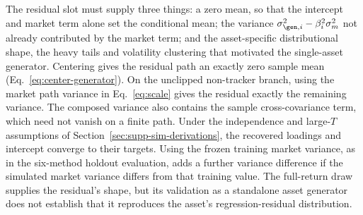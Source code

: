 The residual slot must supply three things: a zero mean, so that the
intercept and market term alone set the conditional mean; the variance
$\sigma_{\gen,i}^2 - \beta_i^2 \sigma_m^2$ not already contributed by
the market term; and the asset-specific distributional shape, the
heavy tails and volatility clustering that motivated the single-asset
generator. Centering gives the residual path an exactly zero sample
mean (Eq.~\eqref{eq:center-generator}). On the unclipped non-tracker
branch, using the market path variance in Eq.~\eqref{eq:scale} gives
the residual exactly the remaining variance. The composed variance
also contains the sample cross-covariance term, which need not vanish
on a finite path. Under the independence and large-$T$ assumptions of
Section~\ref{sec:supp-sim-derivations}, the recovered loadings and
intercept converge to their targets. Using the frozen training market
variance, as in the six-method holdout evaluation, adds a further
variance difference if the simulated market variance differs from that
training value. The full-return draw supplies the residual's shape,
but its validation as a standalone asset generator does not establish
that it reproduces the asset's regression-residual distribution.

